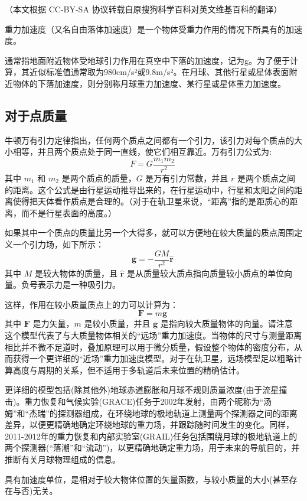 
（本文根据 CC-BY-SA 协议转载自原搜狗科学百科对英文维基百科的翻译）


重力加速度（又名自由落体加速度）是一个物体受重力作用的情况下所具有的加速度。

通常指地面附近物体受地球引力作用在真空中下落的加速度，记为g。为了便于计算，其近似标准值通常取为980cm/s²或9.8m/s²。在月球、其他行星或星体表面附近物体的下落加速度，则分别称月球重力加速度、某行星或星体重力加速度。

\subsection{对于点质量}

牛顿万有引力定律指出，任何两个质点之间都有一个引力，该引力对每个质点的大小相等，并且两个质点处于同一直线，使它们相互靠近。万有引力公式为:
$$F = G \frac{m_1 m_2}{r^2}~$$
其中 $m_1$ 和 $m_2$ 是两个质点的质量，$G$ 是万有引力常数，并且 $r$ 是两个质点之间的距离。这个公式是由行星运动推导出来的，在行星运动中，行星和太阳之间的距离使得把天体看作质点是合理的。（对于在轨卫星来说，“距离”指的是距质心的距离，而不是行星表面的高度。）

如果其中一个质点的质量比另一个大得多，就可以方便地在较大质量的质点周围定义一个引力场，如下所示：
$$\mathbf{g} = -\frac{GM}{r^2} \hat{\mathbf{r}}~$$
其中 $M$ 是较大物体的质量，且 $\hat{\mathbf{r}}$ 是从质量较大质点指向质量较小质点的单位向量。负号表示力是一种吸引力。

这样，作用在较小质量质点上的力可以计算为：
$$\mathbf{F} = m\mathbf{g}~$$
其中 $\mathbf{F}$ 是力矢量，$m$ 是较小质量，并且 $\mathbf{g}$ 是指向较大质量物体的向量。请注意    这个模型代表了与大质量物体相关的“远场”重力加速度。当物体的尺寸与测量距离相比并不微不足道时，叠加原理可以用于微分质量，假设整个物体的密度分布，从而获得一个更详细的“近场”重力加速度模型。对于在轨卫星，远场模型足以粗略计算高度与周期的关系，但不适用于多轨道后未来位置的精确估计。

更详细的模型包括(除其他外)地球赤道膨胀和月球不规则质量浓度(由于流星撞击)。重力恢复和气候实验(GRACE)任务于2002年发射，由两个昵称为“汤姆”和“杰瑞”的探测器组成，在环绕地球的极地轨道上测量两个探测器之间的距离差异，以便更精确地确定环绕地球的重力场，并跟踪随时间发生的变化。同样，2011-2012年的重力恢复和内部实验室(GRAIL)任务包括围绕月球的极地轨道上的两个探测器(“落潮”和“流动”)，以更精确地确定重力场，用于未来的导航目的，并推断有关月球物理组成的信息。

具有加速度单位，是相对于较大物体位置的矢量函数，与较小质量的大小(甚至存在与否)无关。

